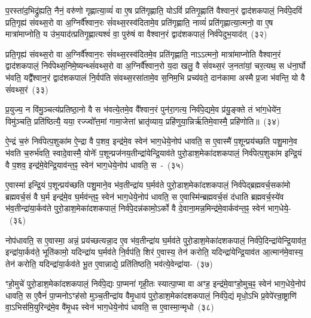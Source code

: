 प॒रस्ता॑द॒भिद्रु॑ह्यति॒ नैनं॒ वरु॑णो गृह्णात्या॒व्यं॑ वा ए॒ष प्रति॑गृह्णाति॒ यो\-ऽविं॑ प्रतिगृ॒ह्णाति॑ वैश्वान॒रं द्वाद॑श\-कपालं॒ निर्व॑पे॒दविं॑ प्रति॒गृह्य॑ संवथ्स॒रो वा अ॒ग्निर्वै᳚श्वान॒रः सं॑वथ्स॒रस्व॑दितामे॒व प्रति॑गृह्णाति॒ नाव्यं॑ प्रति॑\-गृह्णात्या॒त्मनो॒ वा ए॒ष मात्रा॑माप्नोति॒ य उ॑भ॒याद॑त्प्रतिगृ॒ह्णात्यश्वं॑ वा॒ पुरु॑षं वा वैश्वान॒रं द्वाद॑श\-कपालं॒ निर्व॑पेदुभ॒याद॑त्~(३२)

प्रति॒गृह्य॑ संवथ्स॒रो वा अ॒ग्निर्वै᳚श्वान॒रः सं॑वथ्स॒रस्व॑दितमे॒व प्रति॑गृह्णाति॒ ना\-ऽऽ\-त्मनो॒ मात्रा॑माप्नोति वैश्वान॒रं द्वाद॑श\-कपालं॒ निर्व॑पेथ्स॒निमे॒ष्यन्थ्सं॑वथ्स॒रो वा अ॒ग्निर्वै᳚श्वान॒रो य॒दा खलु॒ वै सं॑वथ्स॒रं ज॒नता॑यां॒ चर॒त्यथ॒ स ध॑ना॒र्घो भ॑वति॒ यद्वै᳚श्वान॒रं द्वाद॑श\-कपालं नि॒र्वप॑ति संवथ्स॒रसा॑तामे॒व स॒निम॒भि प्रच्य॑वते॒ दान॑कामा अस्मै प्र॒जा भ॑वन्ति॒ यो वै सं॑वथ्स॒रं~(३३)

प्र॒युज्य॒ न वि॑मु॒ञ्चत्य॑प्रतिष्ठा॒नो वै स भ॑वत्ये॒तमे॒व वै᳚श्वान॒रं पुन॑रा॒गत्य॒ निर्व॑पे॒द्यमे॒व प्र॑यु॒ङ्क्ते तं भा॑ग॒धेये॑न॒ विमु॑ञ्चति॒ प्रति॑ष्ठित्यै॒ यया॒ रज्ज्वो᳚त्त॒मां गामा॒जेत्तां भ्रातृ॑व्याय॒ प्रहि॑णुया॒न्निर्\mbox{}ऋ॑तिमे॒वास्मै॒ प्रहि॑णोति॥~(३४)

{\anuvakamend[{नि॒र्व॒रु॒णं व॑पेदुभ॒याद॒द्यो वै सं॑वथ्स॒रꣳ षट्त्रिꣳ॑शच्च।}]}

ऐ॒न्द्रं च॒रुं निर्व॑पेत्प॒शुका॑म ऐ॒न्द्रा वै प॒शव॒ इन्द्र॑मे॒व स्वेन॑ भाग॒धेये॒नोप॑ धावति॒ स ए॒वास्मै॑ प॒शून्प्रय॑च्छति पशु॒माने॒व भ॑वति च॒रुर्भ॑वति॒ स्वादे॒वास्मै॒ योनेः᳚ प॒शून्प्रज॑नय॒तीन्द्रा॑येन्द्रि॒याव॑ते पुरो॒डाश॒मेका॑\-दश\-कपालं॒ निर्व॑पेत्प॒शुका॑म इन्द्रि॒यं वै प॒शव॒ इन्द्र॑मे॒वेन्द्रि॒याव॑न्त॒ꣴ॒ स्वेन॑ भाग॒धेये॒नोप॑ धावति॒ स~-~(३५)

ए॒वास्मा॑ इन्द्रि॒यं प॒शून्प्रय॑च्छति पशु॒माने॒व भ॑व॒तीन्द्रा॑य घ॒र्मव॑ते पुरो॒डाश॒मेका॑\-दश\-कपालं॒ निर्व॑पेद्ब्रह्मवर्च॒सका॑मो ब्रह्मवर्च॒सं वै घ॒र्म इन्द्र॑मे॒व घ॒र्मव॑न्त॒ꣴ॒ स्वेन॑ भाग॒धेये॒नोप॑ धावति॒ स ए॒वास्मि॑न्ब्रह्मवर्च॒सं द॑धाति ब्रह्मवर्च॒स्ये॑व भ॑व॒तीन्द्रा॑या॒र्कव॑ते पुरो॒डाश॒मेका॑\-दश\-कपालं॒ निर्व॑पे॒दन्न॑कामो॒\-ऽर्को वै दे॒वाना॒मन्न॒मिन्द्र॑मे॒वार्कव॑न्त॒ꣴ॒ स्वेन॑ भाग॒धेये॒-~(३६)

नोप॑धावति॒ स ए॒वास्मा॒ अन्नं॒ प्रय॑च्छत्यन्ना॒द ए॒व भ॑व॒तीन्द्रा॑य घ॒र्मव॑ते पुरो॒डाश॒मेका॑\-दश\-कपालं॒ निर्व॑पे॒दिन्द्रा॑येन्द्रि॒याव॑त॒ इन्द्रा॑\-या॒र्कव॑ते॒ भूति॑कामो॒ यदिन्द्रा॑य घ॒र्मव॑ते नि॒र्वप॑ति॒ शिर॑ ए॒वास्य॒ तेन॑ करोति॒ यदिन्द्रा॑येन्द्रि॒याव॑त आ॒त्मान॑मे॒वास्य॒ तेन॑ करोति॒ यदिन्द्रा॑या॒र्कव॑ते भू॒त ए॒वान्नाद्ये॒ प्रति॑तिष्ठति॒ भव॑त्ये॒वेन्द्रा॑या-~(३७)

ꣳहो॒मुचे॑ पुरो॒डाश॒मेका॑\-दश\-कपालं॒ निर्व॑पे॒द्यः पा॒प्मना॑ गृही॒तः स्यात्पा॒प्मा वा अꣳह॒ इन्द्र॑मे॒वाꣳहो॒मुच॒ꣴ॒ स्वेन॑ भाग॒धेये॒नोप॑ धावति॒ स ए॒वैनं॑ पा॒प्मनो\-ऽꣳह॑सो मुञ्च॒तीन्द्रा॑य वैमृ॒धाय॑ पुरो॒डाश॒मेका॑\-दश\-कपालं॒ निर्व॑पे॒द्यं मृधो॒\-ऽभि प्र॒वेपे॑रन्रा॒ष्ट्राणि॑ वा॒\-ऽभिस॑मि॒युरिन्द्र॑मे॒व वै॑मृ॒धꣴ स्वेन॑ भाग॒धेये॒नोप॑ धावति॒ स ए॒वास्मा॒न्मृधो~(३८)

